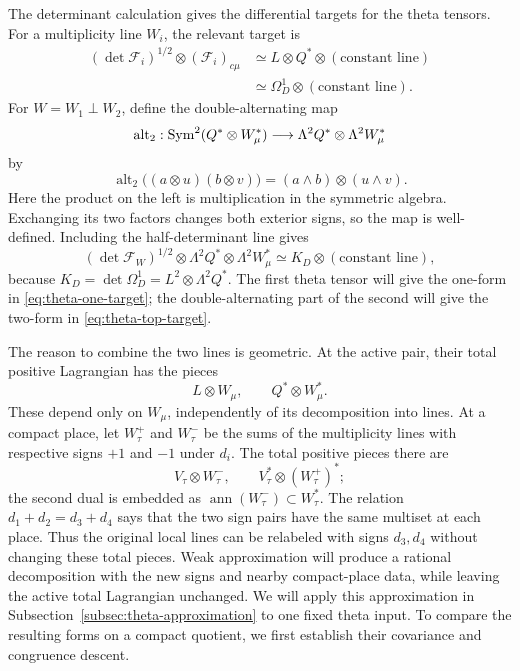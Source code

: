 The determinant calculation gives the differential targets for the
theta tensors.  For a multiplicity line \(W_i\), the relevant target is
\begin{equation}\label{eq:theta-one-target}
\begin{aligned}
 (\det\mathcal F_i)^{1/2}\otimes(\mathcal F_i)_{c\mu}
 &\simeq L\otimes Q^*\otimes(\text{constant line})\\
 &\simeq \Omega_D^1\otimes(\text{constant line}).
\end{aligned}
\end{equation}
For \(W=W_1\perp W_2\), define the double-alternating map
\[
 \operatorname{alt}_2:
 \operatorname{Sym}^2(Q^*\otimes W_\mu^*)\longrightarrow
       \Lambda^2Q^*\otimes\Lambda^2W_\mu^*
\]
by
\[
 \operatorname{alt}_2\bigl((a\otimes u)(b\otimes v)\bigr)
       =(a\wedge b)\otimes(u\wedge v).
\]
Here the product on the left is multiplication in the symmetric
algebra.  Exchanging its two factors changes both exterior signs,
so the map is well-defined.  Including the half-determinant line gives
\begin{equation}\label{eq:theta-top-target}
 (\det\mathcal F_W)^{1/2}\otimes
       \Lambda^2Q^*\otimes\Lambda^2W_\mu^*
       \simeq K_D\otimes(\text{constant line}),
\end{equation}
because \(K_D=\det\Omega_D^1=L^2\otimes\Lambda^2Q^*\).
The first theta tensor will give the one-form in
\eqref{eq:theta-one-target}; the double-alternating part of the second
will give the two-form in \eqref{eq:theta-top-target}.

The reason to combine the two lines is geometric.  At the active pair,
their total positive Lagrangian has the pieces
\[
 L\otimes W_\mu,\qquad Q^*\otimes W_\mu^*.
\]
These depend only on \(W_\mu\), independently of its decomposition
into lines.  At a compact place, let \(W_\tau^+\) and \(W_\tau^-\)
be the sums of the multiplicity lines with respective signs \(+1\)
and \(-1\) under \(d_i\).  The total positive pieces there are
\[
 V_\tau\otimes W_\tau^-,\qquad
 V_\tau^*\otimes(W_\tau^+)^*;
\]
the second dual is embedded as
\(\operatorname{ann}(W_\tau^-)\subset W_\tau^*\).
The relation \(d_1+d_2=d_3+d_4\) says that the two sign pairs have
the same multiset at each place.  Thus the original local lines can
be relabeled with signs \(d_3,d_4\) without changing these total
pieces.  Weak approximation will produce a rational decomposition
with the new signs and nearby compact-place data, while leaving the
active total Lagrangian unchanged.  We will apply this approximation
in Subsection~\ref{subsec:theta-approximation} to one fixed theta
input.  To compare the resulting forms on a compact quotient, we
first establish their covariance and congruence descent.

